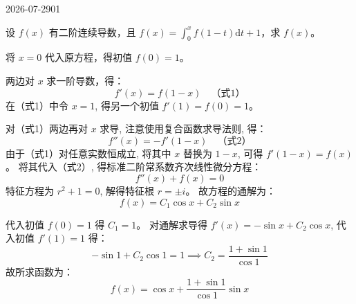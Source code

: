 \begin{mistake}{2026-07-29}{01}

\begin{problemcontent}
设 \( f(x) \) 有二阶连续导数，且 \( f(x) = \int_0^x f(1-t)\mathrm{d}t + 1 \)，求 \( f(x) \)。
\end{problemcontent}

\begin{solutioncontent}
将 \(x=0\) 代入原方程，得初值 \(f(0)=1\)。

两边对 \(x\) 求一阶导数，得：
\[f'(x)=f(1-x) \quad \text{（式1）}\]
在（式1）中令 \(x=1\), 得另一个初值 \(f'(1)=f(0)=1\)。

对（式1）两边再对 \(x\) 求导, 注意使用复合函数求导法则, 得：
\[f''(x) = -f'(1-x) \quad \text{（式2）}\]
由于（式1）对任意实数恒成立, 将其中 \(x\) 替换为 \(1-x\), 可得 \(f'(1-x)=f(x)\)。
将其代入（式2）, 得标准二阶常系数齐次线性微分方程：
\[f''(x)+f(x)=0\]
特征方程为 \(r^2+1=0\), 解得特征根 \(r=\pm i\)。
故方程的通解为：
\[f(x)=C_1\cos x+C_2\sin x\]

代入初值 \(f(0)=1\) 得 \(C_1=1\)。
对通解求导得 \(f'(x)=-\sin x+C_2\cos x\), 代入初值 \(f'(1)=1\) 得：
\[-\sin 1+C_2\cos 1=1 \implies C_2=\frac{1+\sin 1}{\cos 1}\]
故所求函数为：
\[f(x)=\cos x+\frac{1+\sin 1}{\cos 1}\sin x\]
\end{solutioncontent}


\end{mistake}
